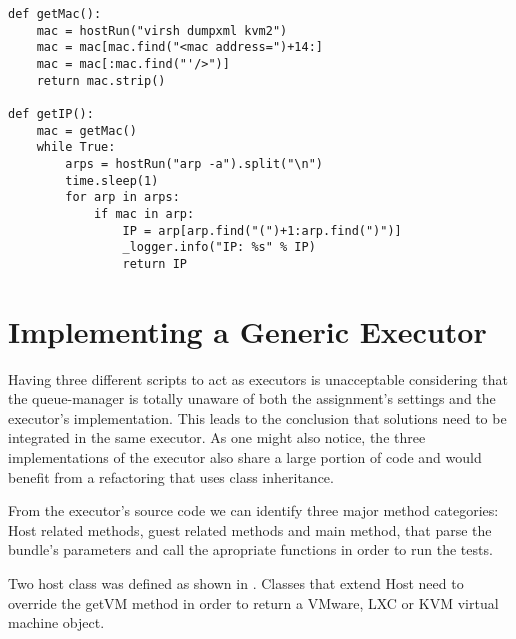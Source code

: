 \lstset{caption=Get the KVM guest's IP, label=lst:kvm-ip}
\begin{lstlisting}
def getMac():
    mac = hostRun("virsh dumpxml kvm2")
    mac = mac[mac.find("<mac address=")+14:]
    mac = mac[:mac.find("'/>")]
    return mac.strip()
    
def getIP():
    mac = getMac()
    while True:
        arps = hostRun("arp -a").split("\n")
        time.sleep(1)
        for arp in arps:
            if mac in arp:
                IP = arp[arp.find("(")+1:arp.find(")")]
                _logger.info("IP: %s" % IP)
                return IP
\end{lstlisting}
       

\section{Implementing a Generic Executor}
\label{sec:vmc-generic}


Having three different scripts to act as executors is unacceptable considering
that the queue-manager is totally unaware of both the assignment's settings
and the executor's implementation. This leads to the conclusion that solutions
need to be integrated in the same executor. As one might also notice, the
three implementations of the executor also share a large portion of code and
would benefit from a refactoring that uses class inheritance.

From the executor's source code we can identify three major method categories:
Host related methods, guest related methods and main method, that parse the
bundle's parameters and call the apropriate functions in order to run the tests.


Two host class was defined as shown in .
Classes that extend Host need to override the getVM method in order to return a
VMware, LXC or KVM virtual machine object.


